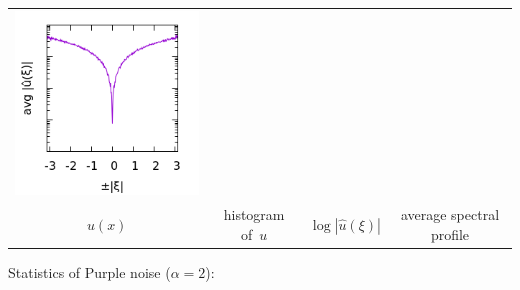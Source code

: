 \begin{tabular}{cccc}
	\includegraphics{KK+1_p.png} \\
	$u(x)$ &
	histogram of~$u$ &
	$\log|\hat u(\xi)|$ &
	average spectral profile
\end{tabular}


Statistics of Purple noise ($\alpha=2$):

